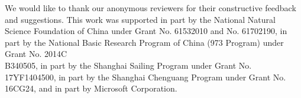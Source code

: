\documentclass[sigconf]{acmart}
\begin{document}
\begin{acks}
We would like to thank our anonymous reviewers for their constructive feedback and suggestions.
This work was supported in part by the National Natural Science Foundation of China under Grant No. 61532010 and No. 61702190, 
in part by the National Basic Research Program of China (973 Program) under Grant No. 2014C\\B340505, 
in part by the Shanghai Sailing Program under Grant No. 17YF1404500,  
in part by the Shanghai Chenguang Program under Grant No. 16CG24, and 
in part by  Microsoft Corporation.
\end{acks}
 

\balance

\end{document}
